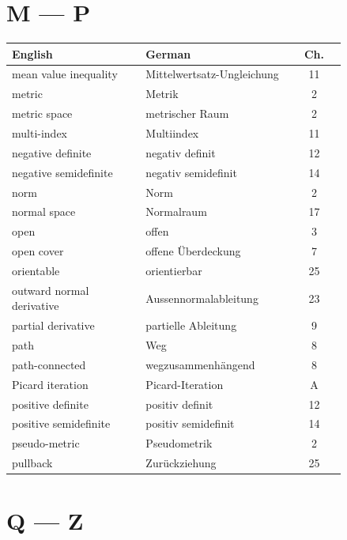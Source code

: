 \section*{M --- P}

\begin{center}
\begin{tabular}{@{}p{0.40\linewidth} p{0.44\linewidth} c@{}}
\textbf{English} & \textbf{German} & \textbf{Ch.} \\
\hline
mean value inequality & Mittelwertsatz-Ungleichung & 11 \\
metric & Metrik & 2 \\
metric space & metrischer Raum & 2 \\
multi-index & Multiindex & 11 \\
negative definite & negativ definit & 12 \\
negative semidefinite & negativ semidefinit & 14 \\
norm & Norm & 2 \\
normal space & Normalraum & 17 \\
open & offen & 3 \\
open cover & offene Überdeckung & 7 \\
orientable & orientierbar & 25 \\
outward normal derivative & Aussennormalableitung & 23 \\
partial derivative & partielle Ableitung & 9 \\
path & Weg & 8 \\
path-connected & wegzusammenhängend & 8 \\
Picard iteration & Picard-Iteration & A \\
positive definite & positiv definit & 12 \\
positive semidefinite & positiv semidefinit & 14 \\
pseudo-metric & Pseudometrik & 2 \\
pullback & Zurückziehung & 25 \\
\end{tabular}
\end{center}

\section*{Q --- Z}

